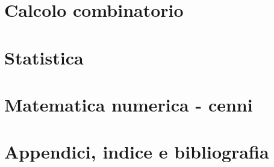 \part{Calcolo combinatorio}\label{book:combinatorics}


\part{Statistica}\label{book:statistics}


\part{Matematica numerica - cenni}\label{book:numerical}


\part{Appendici, indice e bibliografia}
